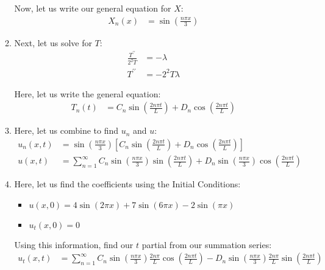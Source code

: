 \documentclass{article}
\begin{document}
\begin{enumerate}
\begin{enumerate}
     Now, let us write our general equation for $X$:
     \begin{align}
       X_n(x) & = \sin \left( \frac{n \pi x}{3} \right)
     \end{align}
     \item Next, let us solve for $T$:
     \begin{align}
       \frac{T^{\prime\prime}}{2^2T} & = -\lambda\\
       T^{\prime\prime} & = - 2^2 T \lambda
     \end{align}

     Here, let us write the general equation:
     \begin{align}
       T_n(t) & = C_n \sin\left( \frac{2 n \pi t}{L} \right) + D_n \cos \left( \frac{2 n \pi t}{L} \right)
     \end{align}

     \item Here, let us combine to find $u_n$ and $u$:
     \begin{align}
       u_n(x, t) & =
       \sin\left( \frac{n \pi x}{3} \right)
       \left[
       C_n \sin \left( \frac{2 n \pi t}{L} \right) +
       D_n \cos \left( \frac{2 n \pi t}{L} \right)
       \right]\\
       u(x, t) & =
       \sum^\infty_{n = 1}
       C_n
       \sin \left( \frac{n \pi x}{3} \right)
       \sin \left( \frac{2 n \pi t}{L} \right) +
       D_n
       \sin \left( \frac{n \pi x}{3} \right)
       \cos \left( \frac{2 n \pi t}{L} \right)
     \end{align}

     \item Here, let us find the coefficients using the Initial Conditions:
     \begin{itemize}
       \item
       $u(x, 0) =
       4 \sin ( 2 \pi x ) +
       7 \sin ( 6 \pi x ) -
       2 \sin( \pi x )$
       \item $u_t(x, 0) = 0$
     \end{itemize}

     Using this information, find our $t$ partial from our summation series:
     \begin{align}
       u_t(x, t) & =
       \sum^\infty_{n = 1}
       C_n
       \sin \left( \frac{n \pi x}{3} \right)
       \frac{2 n \pi}{L}
       \cos \left( \frac{2 n \pi t}{L} \right) -
       D_n
       \sin \left( \frac{n \pi x}{3} \right)
       \frac{2 n \pi}{L}
       \sin \left( \frac{2 n \pi t}{L} \right)
     \end{align}


\end{enumerate}
\end{enumerate}
\end{document}
